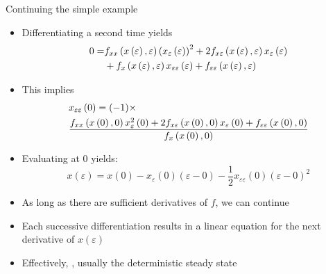 \begin{frame}{Continuing the simple example}
  \begin{itemize}
    \item Differentiating a second time yields
          \begin{align}
            0= & {f_{xx}}\left( {x\left( \varepsilon  \right),\varepsilon } \right){\left( {{x_\varepsilon }\left( \varepsilon  \right)} \right)^2} + 2{f_{x\varepsilon }}\left( {x\left( \varepsilon  \right),\varepsilon } \right){x_\varepsilon }\left( \varepsilon  \right) \notag \\
               & + {f_x}\left( {x\left( \varepsilon  \right),\varepsilon } \right){x_{\varepsilon \varepsilon }}\left( \varepsilon  \right) + {f_{\varepsilon \varepsilon }}\left( {x\left( \varepsilon  \right),\varepsilon } \right)
          \end{align}
    \item This implies
          \hspace{-0.5cm}
          \begin{align*}
             & {x_{\varepsilon \varepsilon }}\left( 0 \right)= (-1)\times                                                                                                                                                                                                                                                    \\
             & \frac{{{f_{xx}}\left( {x\left( 0 \right),0} \right){{x_\varepsilon^2 }\left( 0 \right)} + 2{f_{x\varepsilon }}\left( {x\left( 0 \right),0} \right){x_\varepsilon }\left( 0 \right) + {f_{\varepsilon \varepsilon }}\left( {x\left( 0 \right),0} \right)}}{{{f_x}\left( {x\left( 0 \right),0} \right)}} \notag
          \end{align*}
    \item Evaluating at 0 yields:
          \begin{equation}
            x\left( \varepsilon  \right) = x\left( 0 \right) - {x_\varepsilon }\left( 0 \right)\left( {\varepsilon  - 0} \right) - \frac{1}{2}{x_{\varepsilon \varepsilon }}\left( 0 \right){\left( {\varepsilon  - 0} \right)^2}
          \end{equation}
    \item As long as there are sufficient derivatives of $f$, we can continue
    \item Each successive differentiation results in a linear equation for the next derivative of $x(\varepsilon)$
    \item Effectively, , usually the deterministic steady state
  \end{itemize}
\end{frame}
